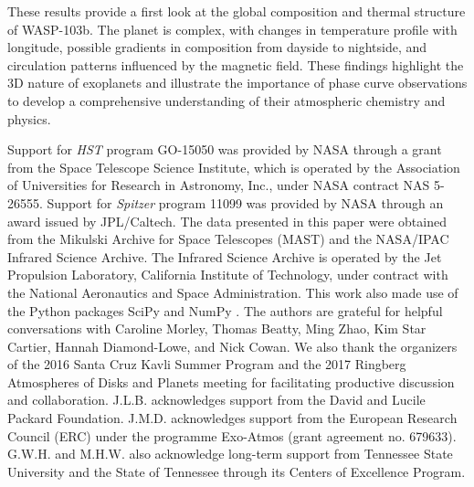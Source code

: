 \documentclass[twocolumn]{aastex61}
\begin{document}
These results provide a first look at the global composition and thermal structure of WASP-103b.  The planet is complex, with changes in temperature profile with longitude, possible gradients in composition from dayside to nightside, and circulation patterns influenced by the magnetic field. These findings highlight the 3D nature of exoplanets and illustrate the importance of phase curve observations to develop a comprehensive understanding of their atmospheric chemistry and physics.




\acknowledgments
Support for \textit{HST} program GO-15050 was provided by NASA through a grant from the Space Telescope Science Institute, which is operated by the Association of Universities for Research in Astronomy, Inc., under NASA contract NAS 5-26555. Support for \textit{Spitzer} program 11099 was provided by NASA through an award issued by JPL/Caltech.  The data presented in this paper were obtained from the Mikulski Archive for Space Telescopes (MAST) and the NASA/IPAC Infrared Science Archive. The Infrared Science Archive is operated by the Jet Propulsion Laboratory, California Institute of Technology, under contract with the National Aeronautics and Space Administration.  This work also made use of the Python packages  SciPy and NumPy \citep{jones_scipy_2001, van2011numpy}. The authors are grateful for helpful conversations with Caroline Morley, Thomas Beatty, Ming Zhao, Kim Star Cartier, Hannah Diamond-Lowe, and Nick Cowan. We also thank the organizers of the 2016 Santa Cruz Kavli Summer Program and the 2017 Ringberg Atmospheres of Disks and Planets meeting for facilitating productive discussion and collaboration.  J.L.B. acknowledges support from the David and Lucile Packard Foundation.  J.M.D. acknowledges support from the European Research Council (ERC) under the programme Exo-Atmos (grant agreement no. 679633). G.W.H. and M.H.W. also acknowledge long-term support from Tennessee State University and the State of Tennessee through its Centers of Excellence Program.



\end{document}
